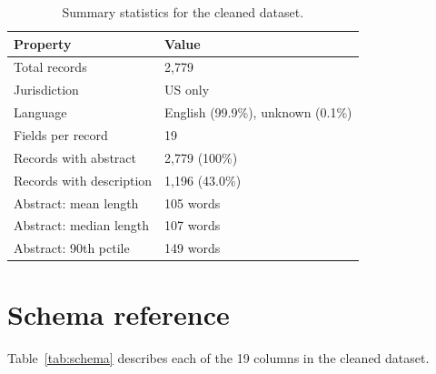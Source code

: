 \documentclass[11pt]{article}
\begin{document}
\begin{table}[h]
  \centering
  \begin{tabular}{ll}
    \toprule
    \textbf{Property} & \textbf{Value} \\
    \midrule
    Total records           & 2,779 \\
    Jurisdiction            & US only \\
    Language                & English (99.9\%), unknown (0.1\%) \\
    Fields per record       & 19 \\
    Records with abstract   & 2,779 (100\%) \\
    Records with description & 1,196 (43.0\%) \\
    Abstract: mean length   & 105 words \\
    Abstract: median length & 107 words \\
    Abstract: 90th pctile  & 149 words \\
    \bottomrule
  \end{tabular}
  \caption{Summary statistics for the cleaned dataset.}
  \label{tab:summary}
\end{table}

\section{Schema reference}
\label{sec:schema}

Table~\ref{tab:schema} describes each of the 19 columns in the cleaned dataset.
\end{document}
